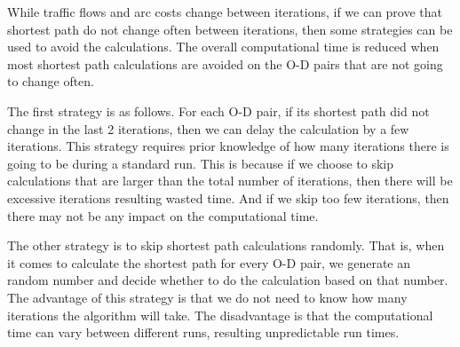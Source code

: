 While traffic flows and arc costs change between iterations,
if we can prove that shortest path do not change often between iterations,
then some strategies can be used to avoid the calculations.
The overall computational time is reduced when most shortest path calculations are avoided on the O-D pairs that are not going to change often.

The first strategy is as follows.
For each O-D pair,
if its shortest path did not change in the last 2 iterations,
then we can delay the calculation by a few iterations.
This strategy requires prior knowledge of how many iterations there is going to be during a standard run.
This is because if we choose to skip calculations that are larger than the total number of iterations,
then there will be excessive iterations resulting wasted time.
And if we skip too few iterations,
then there may not be any impact on the computational time.

The other strategy is to skip shortest path calculations randomly.
That is, when it comes to calculate the shortest path for every O-D pair,
we generate an random number and decide whether to do the calculation based on that number.
The advantage of this strategy is that we do not need to know how many iterations the algorithm will take.
The disadvantage is that the computational time can vary between different runs,
resulting unpredictable run times.

\begin{comment}
    \section{Preprocessing and More}
    Preprocessing - trade memory to get faster time.
    We can either do a fast preprocessing between iterations to make query in each iteration (so combined speed is still faster) 
    or do a long preprocessing at the start and use the computed heuristic values
    \begin{itemize}
        \item A* landmarks and triangle inequality (ALT)
        \item Reach-based routing 
        \item ALT + Reach
        \item Geometric Containers
        \item Arc Flags
    \end{itemize}

    If we have more data on the network we can use
    algorithms that use hierarchies.
    Consider roads with higher speed first: use a hierarchy of subgraphs.
    \begin{itemize}
        \item Radius search.
        \item multi-level approach
        \item highway hierarchies
    \end{itemize}
\end{comment}

